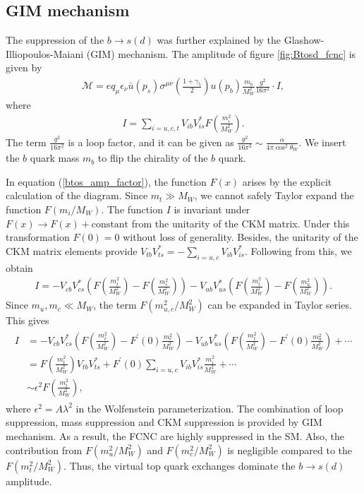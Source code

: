 \subsection{GIM mechanism}\label{GIM}
The suppression of the $b\to s(d)$ was further explained by the Glashow-Illiopoulos-Maiani (GIM) mechanism. The amplitude of figure \ref{fig:Btosd_fcnc} is given by \cite{Grinstein:2017pvg}
\begin{eqnarray}
\mathcal{M}=e q_{\mu} \epsilon_{\nu} \bar{u}\left(p_{s}\right) \sigma^{\mu \nu}\left(\frac{1+\gamma_{5}}{2}\right) u\left(p_{b}\right) \frac{m_{b}}{M_{W}^{2}} \frac{g^{2}}{16 \pi^{2}} \cdot I,
\end{eqnarray}
where 
\begin{eqnarray}\label{btos_amp_factor}
I=\sum_{i=u, c, t} V_{i b} V_{i s}^{*} F\left(\frac{m_{i}^{2}}{M_{W}^{2}}\right).
\end{eqnarray}
The term $\frac{g^2}{16\pi^2}$ is a loop factor, and it can be given as $\frac{g^{2}}{16 \pi^{2}} \sim \frac{\alpha}{4 \pi \cos^2\theta_{W}}$. We insert the $b$ quark mass $m_b$ to flip the chirality of the $b$ quark.\par
In equation (\ref{btos_amp_factor}), the function $F(x)$ arises by the explicit calculation of the diagram. Since $m_t\gg M_W$, we cannot safely Taylor expand the function $F(m_i/M_W)$. The function $I$ is invariant under $F(x)\to F(x)+ \mbox{constant}$ from the unitarity of the CKM matrix. Under this transformation $F(0)=0$ without loss of generality. Besides, the unitarity of the CKM matrix elements provide $V_{t b} V_{t s}^{*}=-\sum_{i=u, c} V_{i b} V_{i s}^{*}$. Following from this, we obtain
\begin{eqnarray}
I=-V_{c b} V_{c s}^{*}\left(F\left(\frac{m_{t}^{2}}{M_{W}^{2}}\right)-F(\frac{m_{c}^{2}}{M_{W}^{2}}) \right)-V_{u b} V_{u s}^{*}\left(F\left(\frac{m_{t}^{2}}{M_{W}^{2}}\right)-F(\frac{m_{u}^{2}}{M_{W}^{2}}) \right).
\end{eqnarray}
Since $m_u, m_c\ll M_W$, the term $F(m_{u,c}^2/M_W^2)$ can be expanded in Taylor series. This gives
\begin{eqnarray}
\begin{aligned}
I &=-V_{c b} V_{c s}^{*}\left(F\left(\frac{m_{t}^{2}}{M_{W}^{2}}\right)-F^{\prime}(0) \frac{m_{c}^{2}}{M_{W}^{2}}\right)-V_{u b} V_{u s}^{*}\left(F\left(\frac{m_{t}^{2}}{M_{W}^{2}}\right)-F^{\prime}(0) \frac{m_{u}^{2}}{M_{W}^{2}}\right)+\cdots \\
&=F\left(\frac{m_{t}^{2}}{M_{W}^{2}}\right) V_{t b} V_{t s}^{*}+F^{\prime}(0) \sum_{i=u, c} V_{i b} V_{i s}^{*} \frac{m_{i}^{2}}{M_{W}^{2}}+\cdots \\
& \sim \epsilon^{2} F\left(\frac{m_{t}^{2}}{M_{W}^{2}}\right),
\end{aligned}
\end{eqnarray}
where $\epsilon^{2}=A\lambda^2$ in the Wolfenstein parameterization. The combination of loop suppression, mass suppression and CKM suppression is provided by GIM mechanism. As a result, the FCNC are highly suppressed in the SM. Also, the contribution from $F(m_u^2/M_W^2)$ and $F(m_c^2/M_W^2)$ is negligible compared to the $F(m_t^2/M_W^2)$. Thus, the virtual top quark exchanges dominate the $b\to s(d)$ amplitude.
